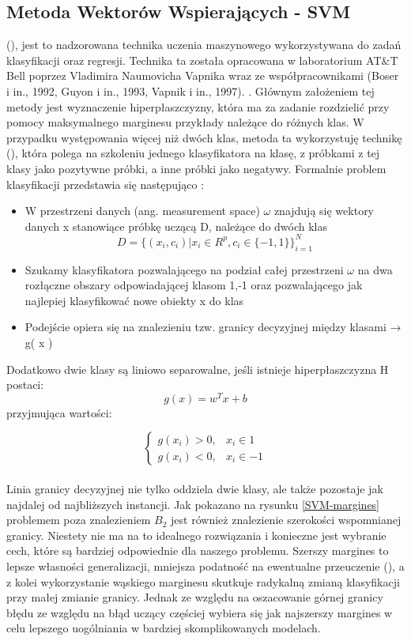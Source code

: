 \subsection{Metoda Wektorów Wspierających - SVM}
 (), jest to nadzorowana technika uczenia maszynowego wykorzystywana do zadań klasyfikacji oraz regresji. Technika ta została opracowana w laboratorium AT\&T Bell poprzez Vladimira Naumovicha Vapnika wraz ze współpracownikami (Boser i in., 1992, Guyon i in., 1993, Vapnik i in., 1997). \cite{Wiki:SVM}. Głównym założeniem tej metody jest wyznaczenie hiperpłaszczyzny, która ma za zadanie rozdzielić przy pomocy maksymalnego marginesu przykłady należące do różnych klas. W przypadku występowania więcej niż dwóch klas, metoda ta wykorzystuję technikę  (), która polega na szkoleniu jednego klasyfikatora na klasę, z próbkami z tej klasy jako pozytywne próbki, a inne próbki jako negatywy. Formalnie problem klasyfikacji przedstawia się następująco \cite{Prezentacja:SVM2}: 
\begin{itemize}
    \item W przestrzeni danych (ang. measurement space) $\omega$ znajdują się wektory danych x stanowiące próbkę uczącą D, należące do dwóch klas\\
    \begin{equation}
D = \big\{(x_{i}, c_{i}) | x_{i} \in R^{p}, c_{i} \in \{-1, 1\}\big\}_{i=1}^{N}
    \end{equation}
    \item Szukamy klasyfikatora pozwalającego na podział całej przestrzeni $\omega$ na dwa rozłączne obszary odpowiadającej klasom {1,-1} oraz pozwalającego jak najlepiej klasyfikować nowe obiekty x do klas
    \item Podejście opiera się na znalezieniu tzw. granicy decyzyjnej między klasami → g( x )
\end{itemize}
Dodatkowo dwie klasy są liniowo separowalne, jeśli istnieje hiperpłaszczyzna H postaci: \[g(x) = w^Tx + b\] przyjmująca wartości: 

\[
    \begin{cases}
            g(x_{i}) > 0,& x_{i} \in 1 \\
            g(x_{i}) < 0,& x_{i} \in -1
    \end{cases}
\]
\\

Linia granicy decyzyjnej nie tylko oddziela dwie klasy, ale także pozostaje jak najdalej od najbliższych instancji. Jak pokazano na rysunku \ref{SVM-margines} problemem poza znalezieniem $B_{2}$ jest również znalezienie szerokości wspomnianej granicy. Niestety nie ma na to idealnego rozwiązania i konieczne jest wybranie cech, które są bardziej odpowiednie dla naszego problemu. Szerszy margines to lepsze własności generalizacji, mniejsza podatność na
ewentualne przeuczenie (), a z kolei wykorzystanie wąskiego marginesu skutkuje radykalną zmianą klasyfikacji przy małej zmianie granicy. Jednak ze względu na oszacowanie górnej granicy błędu ze względu na błąd uczący częściej wybiera się jak najszerszy margines w celu lepszego uogólniania w bardziej skomplikowanych modelach.

